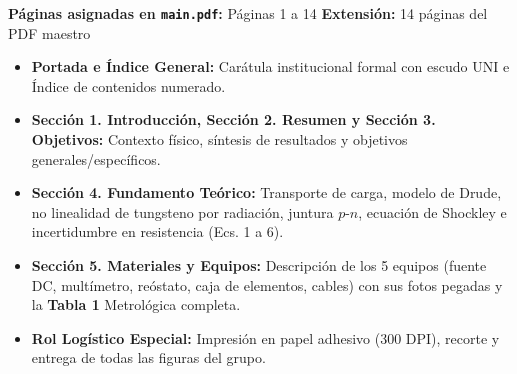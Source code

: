 \documentclass[a4paper, 10pt]{article}
\begin{document}
\vspace{0.05cm}

\begin{tcolorbox}[title=BLOQUE 1 — Asignado a: Jesús Rodolfo Vera Vivanco, colframe=uni-blue]
    \footnotesize
    \textbf{Páginas asignadas en \texttt{main.pdf}:} Páginas 1 a 14 \hfill \textbf{Extensión:} 14 páginas del PDF maestro
    \begin{itemize}[leftmargin=1.5em, itemsep=1.2pt, topsep=1pt]
        \item \textbf{Portada e Índice General:} Carátula institucional formal con escudo UNI e Índice de contenidos numerado.
        \item \textbf{Sección 1. Introducción, Sección 2. Resumen y Sección 3. Objetivos:} Contexto físico, síntesis de resultados y objetivos generales/específicos.
        \item \textbf{Sección 4. Fundamento Teórico:} Transporte de carga, modelo de Drude, no linealidad de tungsteno por radiación, juntura $p$-$n$, ecuación de Shockley e incertidumbre en resistencia (Ecs. 1 a 6).
        \item \textbf{Sección 5. Materiales y Equipos:} Descripción de los 5 equipos (fuente DC, multímetro, reóstato, caja de elementos, cables) con sus fotos pegadas y la \textbf{Tabla 1} Metrológica completa.
        \item \textbf{Rol Logístico Especial:} Impresión en papel adhesivo (300 DPI), recorte y entrega de todas las figuras del grupo.
    \end{itemize}
\end{tcolorbox}

\vspace{0.05cm}
\end{document}
